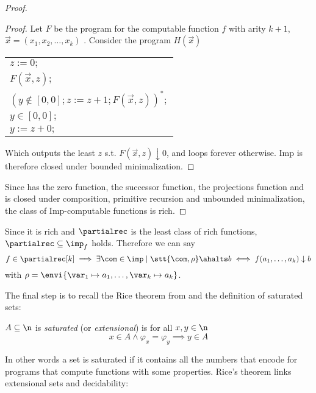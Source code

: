 \begin{proof}
  \begin{proof}
    Let \(F\) be the program for the computable function \(f\)
    with arity \(k+1\), \(\vec{x} = (x_1, x_2, \dots, x_k)\)
    . Consider the program \(H(\vec{x})\)
    \begin{center}
      \begin{tabular}{l}
        \(z := 0;\)\\[0pt]
        \(F(\vec{x},z);\)\\[0pt]
        \((y \not\in [0,0];z := z + 1;F(\vec{x},z))^*;\)\\[0pt]
        \(y\in [0,0];\)\\[0pt]
        \(y := z + 0;\)\\[0pt]
      \end{tabular}

    \end{center}
    Which outputs the least \(z\) s.t. \(F(\vec{x},z) \downarrow 0\),
    and loops forever otherwise. Imp is therefore closed under bounded
    minimalization.
  \end{proof}
  Since has the zero function, the successor function, the projections
  function and is closed under composition, primitive recursion and
  unbounded minimalization, the class of Imp-computable functions is
  rich.
\end{proof}

Since it is rich and \(\partialrec\) is the least class of rich
functions, \(\partialrec \subseteq \imp_f\) holds. Therefore we can
say \[f \in \partialrec[k] \implies \exists \com \in \imp \mid
\stt{\com, \rho}\ahalts b \iff f(a_1, \dots, a_k) \downarrow b\]
with \(\rho = \envi{\var_1 \mapsto a_1, \dots, \var_k \mapsto a_k}\).

The final step is to recall the Rice theorem from
\cite{rice1953classes} and the definition of saturated sets:

\begin{definition}
  \(A \subseteq \n\) is \emph{saturated} (or \emph{extensional}) is
  for all \(x,y\in\n\)
  \begin{equation*}
    x \in A \wedge \varphi_x = \varphi_y \implies y \in A
  \end{equation*}
\end{definition}

In other words a set is saturated if it contains all the numbers that
encode for programs that compute functions with some
properties. Rice's theorem links extensional sets and decidability:

